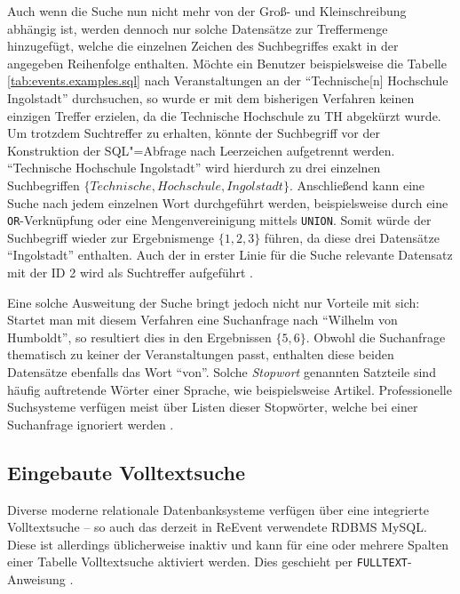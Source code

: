 Auch wenn die Suche nun nicht mehr von der Groß- und Kleinschreibung abhängig ist, werden dennoch nur solche Datensätze zur Treffermenge hinzugefügt, welche die einzelnen Zeichen des Suchbegriffes exakt in der angegeben Reihenfolge enthalten. Möchte ein Benutzer beispielsweise die Tabelle \ref{tab:events.examples.sql} nach Veranstaltungen an der \enquote{Technische[n] Hochschule Ingolstadt} durchsuchen, so wurde er mit dem bisherigen Verfahren keinen einzigen Treffer erzielen, da die Technische Hochschule zu TH abgekürzt wurde. Um trotzdem Suchtreffer zu erhalten, könnte der Suchbegriff vor der Konstruktion der SQL"=Abfrage nach Leerzeichen aufgetrennt werden. \enquote{Technische Hochschule Ingolstadt} wird hierdurch zu drei einzelnen Suchbegriffen $\{Technische, Hochschule, Ingolstadt \}$. Anschließend kann eine Suche nach jedem einzelnen Wort durchgeführt werden, beispielsweise durch eine \texttt{OR}-Verknüpfung oder eine Mengenvereinigung mittels \texttt{UNION}. Somit würde der Suchbegriff wieder zur Ergebnismenge $\{1, 2, 3\}$ führen, da diese drei Datensätze \enquote{Ingolstadt} enthalten. Auch der in erster Linie für die Suche relevante Datensatz mit der ID 2 wird als Suchtreffer aufgeführt \cite[S. 52]{Grainger.2014}.

Eine solche Ausweitung der Suche bringt jedoch nicht nur Vorteile mit sich: Startet man mit diesem Verfahren eine Suchanfrage nach \enquote{Wilhelm von Humboldt}, so resultiert dies in den Ergebnissen $\{5,6\}$. Obwohl die Suchanfrage thematisch zu keiner der Veranstaltungen passt, enthalten diese beiden Datensätze ebenfalls das Wort \enquote{von}. Solche \emph{Stopwort} genannten Satzteile sind häufig auftretende Wörter einer Sprache, wie beispielsweise Artikel. Professionelle Suchsysteme verfügen meist über Listen dieser Stopwörter, welche bei einer Suchanfrage ignoriert werden \cite[S. 89]{Buttcher.2010}.

\subsection{Eingebaute Volltextsuche}

Diverse moderne relationale Datenbanksysteme verfügen über eine integrierte Volltextsuche -- so auch das derzeit in ReEvent verwendete RDBMS MySQL. Diese ist allerdings üblicherweise inaktiv und kann für eine oder mehrere Spalten einer Tabelle Volltextsuche aktiviert werden. Dies geschieht per \texttt{FULLTEXT}-Anweisung \cite[S. 191]{Nixon.2014}.

